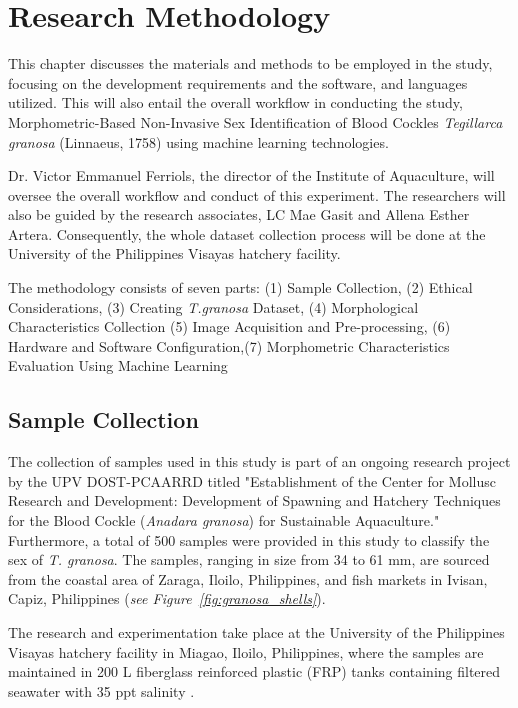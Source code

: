 \chapter{Research Methodology}
\label{sec:methodology}

This chapter discusses the materials and methods to be employed in the study, focusing on the development requirements and the software, and languages utilized. This will also entail the overall workflow in conducting the study, Morphometric-Based Non-Invasive Sex Identification of Blood Cockles \textit{Tegillarca granosa} (Linnaeus, 1758) using machine learning technologies.

Dr. Victor Emmanuel Ferriols, the director of the Institute of Aquaculture, will oversee the overall workflow and conduct of this experiment. The researchers will also be guided by the research associates, LC Mae Gasit and Allena Esther Artera. Consequently, the whole dataset collection process will be done at the University of the Philippines Visayas hatchery facility. 

The methodology consists of seven parts: (1) Sample Collection, (2) Ethical Considerations, (3) Creating \textit{T.granosa} Dataset, (4) Morphological Characteristics Collection (5) Image Acquisition and Pre-processing, (6) Hardware and Software Configuration,(7) Morphometric Characteristics Evaluation Using Machine Learning


\section{Sample Collection}
\label{sec:samplecollect}
The collection of \Tgranosa samples used in this study is part of an ongoing research project by the UPV DOST-PCAARRD titled "Establishment of the Center for Mollusc Research and Development: Development of Spawning and Hatchery Techniques for the Blood Cockle (\textit{Anadara granosa}) for Sustainable Aquaculture." Furthermore, a total of 500 samples were provided in this study to classify the sex of \textit{T. granosa}.  The samples, ranging in size from 34 to 61 mm, are sourced from the coastal area of Zaraga, Iloilo, Philippines, and fish markets in Ivisan, Capiz, Philippines (\textit{see Figure~\ref{fig:granosa_shells}}). 

The research and experimentation take place at the University of the Philippines Visayas hatchery facility in Miagao, Iloilo, Philippines, where the samples are maintained in 200 L fiberglass reinforced plastic (FRP) tanks containing filtered seawater with 35 ppt salinity \cite{miranda2023}. 


